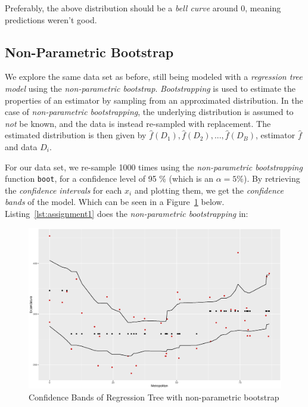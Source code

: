 \documentclass[a4paper,12pt]{article}
\begin{document}
        Preferably, the above distribution should be a \emph{bell curve} around 0, meaning predictions weren't good.

    \subsection*{Non-Parametric Bootstrap}

        We explore the same data set as before, still being modeled with a \emph{regression tree model} using the \emph{non-parametric bootstrap}. \emph{Bootstrapping} is used to estimate the properties of an estimator by sampling from an approximated distribution. In the case of \emph{non-parametric bootstrapping}, the underlying distribution is assumed to \emph{not} be known, and the data is instead re-sampled with replacement. The estimated distribution is then given by $\hat{f}(D_1), \hat{f}(D_2), ..., \hat{f}(D_B)$, estimator $\hat{f}$ and data $D_i$.

        For our data set, we re-sample 1000 times using the \emph{non-parametric bootstrapping} function \texttt{boot}, for a confidence level of 95 \% (which is an $\alpha = 5\%$). By retrieving the \emph{confidence intervals} for each $x_i$ and plotting them, we get the \emph{confidence bands} of the model. Which can be seen in a Figure~\ref{fig:confidence_bands} below. Listing~\ref{lst:assignment1} does the \emph{non-parametric bootstrapping} in:

        

        \begin{figure}[H]
            \centering
            \caption{Confidence Bands of Regression Tree with non-parametric bootstrap}
            \label{fig:confidence_bands}
            \includegraphics[width=\textwidth]{share/A1_nonparametric.eps}
        \end{figure}
\end{document}
